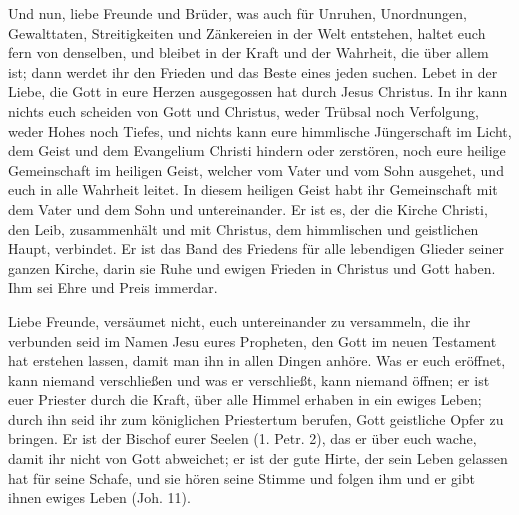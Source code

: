 {    Und nun, liebe Freunde und Brüder, was auch für Unruhen,
    Unordnungen, Gewalttaten, Streitigkeiten und Zänkereien in der
    Welt entstehen, haltet euch fern von denselben, und bleibet in
    der Kraft und der Wahrheit, die über allem ist; dann werdet ihr
    den Frieden und das Beste eines jeden suchen. Lebet in der Liebe,
    die Gott in eure Herzen ausgegossen hat durch Jesus Christus.
    In ihr kann nichts euch scheiden von Gott und Christus, weder
    Trübsal noch Verfolgung, weder Hohes noch Tiefes, und nichts
    kann eure himmlische Jüngerschaft im Licht, dem Geist und dem
    Evangelium Christi hindern oder zerstören, noch eure heilige
    Gemeinschaft im heiligen Geist, welcher vom Vater und vom
    Sohn ausgehet, und euch in alle Wahrheit leitet. In diesem
    heiligen Geist habt ihr Gemeinschaft mit dem Vater und dem Sohn
    und untereinander. Er ist es, der die Kirche 
    Christi, den Leib,
    zusammenhält und mit Christus, dem himmlischen und geistlichen
    Haupt, verbindet. Er ist das Band des Friedens für alle 
    lebendigen Glieder seiner ganzen Kirche, darin sie Ruhe und ewigen
    Frieden in Christus und Gott haben. Ihm sei Ehre und Preis
    immerdar.

    Liebe Freunde, versäumet nicht, euch untereinander zu 
    versammeln, die ihr verbunden seid im Namen Jesu eures Propheten,
    den Gott im neuen Testament hat erstehen lassen, damit man
    ihn in allen Dingen anhöre. Was er euch eröffnet, kann niemand
    verschließen und was er verschließt, kann niemand öffnen; er ist
    euer Priester durch die Kraft, über alle Himmel erhaben in ein
    ewiges Leben; durch ihn seid ihr zum königlichen Priestertum 
    berufen, Gott geistliche Opfer zu bringen. Er ist der Bischof eurer
    Seelen (1. Petr. 2), das er 
    über euch wache, damit ihr nicht von
    Gott abweichet; er ist der gute Hirte, der sein Leben gelassen hat
    für seine Schafe, und sie hören seine Stimme und folgen ihm und
    er gibt ihnen ewiges Leben (Joh. 11).

}
